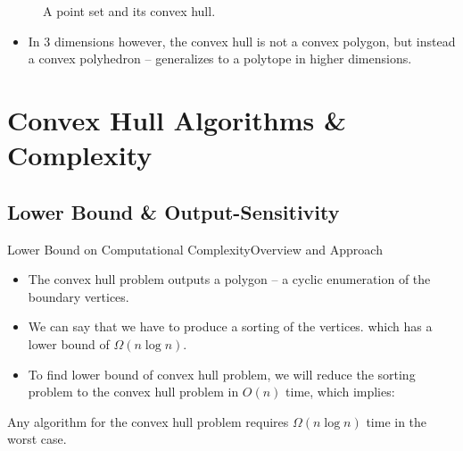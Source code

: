 \documentclass{beamer}
\begin{document}
\begin{frame}[t]
\begin{figure}
\begin{subfigure}{0.35\textwidth}
      \end{subfigure}
      \caption{A point set and its convex hull.}
    \end{figure}
    \begin{itemize}
    \item In 3 dimensions however, the convex hull is not a convex polygon, but instead a 
    convex polyhedron -- generalizes to a polytope in higher dimensions.
  \end{itemize}
\end{frame}

\section{Convex Hull Algorithms \& Complexity}
\subsection{Lower Bound \& Output-Sensitivity}
    \begin{frame}[t]{Lower Bound on Computational Complexity}{Overview and Approach}
    \begin{itemize}
        \item The convex hull problem outputs a polygon -- a cyclic enumeration of the boundary vertices.
        \item We can say that we have to produce a sorting of the vertices.
        which has a lower bound of $\Omega(n\log n)$.
        \item To find lower bound of convex hull problem, we will reduce the sorting problem to the 
        convex hull problem in $O(n)$ time, which implies:
    \end{itemize}  
    \begin{theorem}
    Any algorithm for the convex hull problem requires $\Omega(n\log n)$ time in the worst case.
    \end{theorem}
    \end{frame}
    
\end{document}
